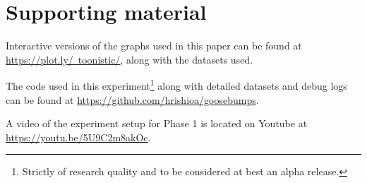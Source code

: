 \documentclass[
hidelinks,
12pt, %
oneside, %
english, %
doublespacing, %
headsepline, %
]{MastersDoctoralThesis} %
\begin{document}

\appendix %

\chapter{Supporting material}

Interactive versions of the graphs used in this paper can be found at \href{https://plot.ly/~toonistic/}{https://plot.ly/~toonistic/}, along with the datasets used.

The code used in this experiment\footnote{Strictly of research quality and to be considered at best an alpha release.} along with detailed datasets and debug logs can be found at \href{https://github.com/hrishioa/goosebumps}{https://github.com/hrishioa/goosebumps}.

A video of the experiment setup for Phase 1 is located on Youtube at \href{https://youtu.be/5U9C2m8akOc}{https://youtu.be/5U9C2m8akOc}.


% 
%
%


\printbibliography[heading=bibintoc]

\end{document}
